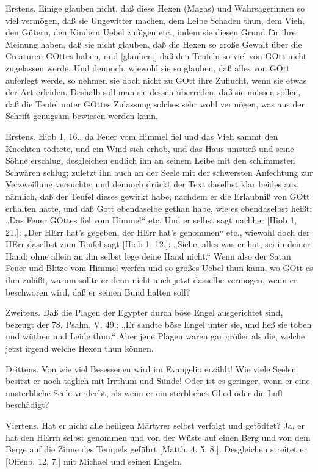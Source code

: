 Erstens. Einige glauben nicht, daß diese Hexen (Magas) und Wahrsagerinnen so viel vermögen, daß sie Ungewitter machen, dem Leibe Schaden thun, dem Vieh, den Gütern, den Kindern Uebel zufügen etc., indem sie diesen Grund für ihre Meinung haben, daß sie nicht glauben, daß die Hexen so große Gewalt über die Creaturen GOttes haben, und [glauben,] daß den Teufeln so viel von GOtt nicht zugelassen werde. Und dennoch, wiewohl sie so glauben, daß alles von GOtt auferlegt werde, so nehmen sie doch nicht zu GOtt ihre Zuflucht, wenn sie etwas der Art erleiden. Deshalb soll man sie dessen überreden, daß sie müssen sollen, daß die Teufel unter GOttes Zulassung solches sehr wohl vermögen, was aus der Schrift genugsam bewiesen werden kann.

Erstens. Hiob 1, 16., da Feuer vom Himmel fiel und das Vieh sammt den Knechten tödtete, und ein Wind sich erhob, und das Haus umstieß und seine Söhne erschlug, desgleichen endlich ihn an seinem Leibe mit den schlimmsten Schwären schlug; zuletzt ihn auch an der Seele mit der schwersten Anfechtung zur Verzweiflung versuchte; und dennoch drückt der Text daselbst klar beides aus, nämlich, daß der Teufel dieses gewirkt habe, nachdem er die Erlaubniß von GOtt erhalten hatte, und daß Gott ebendaselbe gethan habe, wie es ebendaselbst heißt: „Das Feuer GOttes fiel vom Himmel“ etc. Und er selbst sagt nachher [Hiob 1, 21.]: „Der HErr hat’s gegeben, der HErr hat’s genommen“ etc., wiewohl doch der HErr daselbst zum Teufel sagt [Hiob 1, 12.]: „Siehe, alles was er hat, sei in deiner Hand; ohne allein an ihn selbst lege deine Hand nicht.“ Wenn also der Satan Feuer und Blitze vom Himmel werfen und so großes Uebel thun kann, wo GOtt es ihm zuläßt, warum sollte er denn nicht auch jetzt dasselbe vermögen, wenn er beschworen wird, daß er seinen Bund halten soll?

Zweitens. Daß die Plagen der Egypter durch böse Engel ausgerichtet sind, bezeugt der 78. Psalm, V. 49.: „Er sandte böse Engel unter sie, und ließ sie toben und wüthen und Leide thun.“ Aber jene Plagen waren gar größer als die, welche jetzt irgend welche Hexen thun können.

Drittens. Von wie viel Besessenen wird im Evangelio erzählt! Wie viele Seelen besitzt er noch täglich mit Irrthum und Sünde! Oder ist es geringer, wenn er eine unsterbliche Seele verderbt, als wenn er ein sterbliches Glied oder die Luft beschädigt?

Viertens. Hat er nicht alle heiligen Märtyrer selbst verfolgt und getödtet? Ja, er hat den HErrn selbst genommen und von der Wüste auf einen Berg und von dem Berge auf die Zinne des Tempels geführt [Matth. 4, 5. 8.]. Desgleichen streitet er [Offenb. 12, 7.] mit Michael und seinen Engeln.

